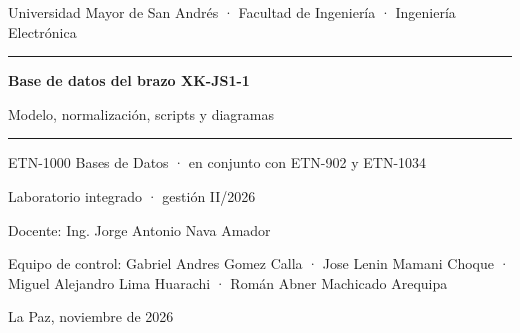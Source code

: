 \documentclass[a4paper,11pt]{article}
\begin{document}
\begin{titlepage}
\centering
\vspace*{1.5cm}
{\large Universidad Mayor de San Andrés · Facultad de Ingeniería · Ingeniería Electrónica\par}
\vspace{1.0cm}
{\color{naranja!80!black}\rule{\linewidth}{1.5pt}\par}
\vspace{0.4cm}
{\Huge\bfseries Base de datos del brazo XK-JS1-1\par}
\vspace{0.3cm}
{\LARGE Modelo, normalización, scripts y diagramas\par}
\vspace{0.3cm}
{\color{naranja!80!black}\rule{\linewidth}{1.5pt}\par}
\vspace{1cm}
{\large ETN-1000 Bases de Datos · en conjunto con ETN-902 y ETN-1034\par}
\vspace{0.3cm}
{\large Laboratorio integrado · gestión II/2026\par}
\vspace{1.2cm}
\vfill
{\large Docente: Ing. Jorge Antonio Nava Amador\par}
\vspace{0.3cm}
{Equipo de control: Gabriel Andres Gomez Calla · Jose Lenin Mamani Choque · Miguel Alejandro Lima Huarachi · Román Abner Machicado Arequipa\par}
\vspace{0.5cm}
{\small La Paz, noviembre de 2026\par}
\end{titlepage}

{\setlength{\parskip}{0pt}\tableofcontents}
\newpage
\end{document}
